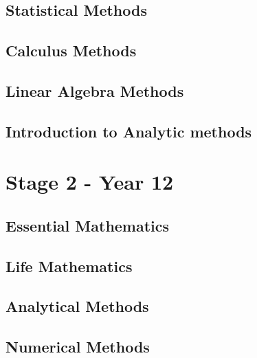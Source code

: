\documentclass[11pt]{report}
\begin{document}
\subsection{Statistical Methods}
\subsection{Calculus Methods}
\subsection{Linear Algebra Methods}
\subsection{Introduction to Analytic methods}

\section{Stage 2 - Year 12}

\subsection{Essential Mathematics}
\subsection{Life Mathematics}
\subsection{Analytical Methods}
\subsection{Numerical Methods}
\end{document}
